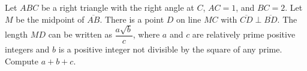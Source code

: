 Let $ABC$ be a right triangle with the right angle at $C$, $AC=1$, and $BC=2$. Let $M$ be the midpoint of $\overline{AB}$. There is a point $D$ on line $MC$ with $\overline{CD}\perp\overline{BD}$. The length $MD$ can be written as $\dfrac{a\sqrt b}{c}$, where $a$ and $c$ are relatively prime positive integers and $b$ is a positive integer not divisible by the square of any prime. Compute $a+b+c$.
